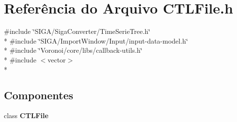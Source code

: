 \section{Referência do Arquivo C\+T\+L\+File.\+h}
\label{_c_t_l_file_8h}
{\ttfamily \#include \char`\"{}S\+I\+G\+A/\+Siga\+Converter/\+Time\+Serie\+Tree.\+h\char`\"{}}\\*
{\ttfamily \#include \char`\"{}S\+I\+G\+A/\+Import\+Window/\+Input/input-\/data-\/model.\+h\char`\"{}}\\*
{\ttfamily \#include \char`\"{}Voronoi/core/libs/callback-\/utils.\+h\char`\"{}}\\*
{\ttfamily \#include $<$vector$>$}\\*
\subsection*{Componentes}
\begin{DoxyCompactItemize}
\item 
class {\bf C\+T\+L\+File}
\end{DoxyCompactItemize}

